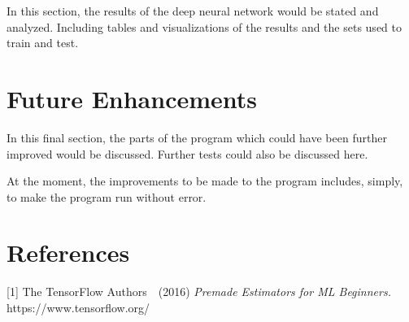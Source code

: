 \documentclass{article}
\begin{document}
In this section, the results of the deep neural network would
be stated and analyzed. Including tables and visualizations of
the results and the sets used to train and test.

\section{Future Enhancements}

In this final section, the parts of the program which could have
been further improved would be discussed. Further tests could also
be discussed here.

At the moment, the improvements to be made to the program includes,
simply, to make the program run without error.

\section*{References}

\small

[1] The TensorFlow Authors\ \ (2016) {\it Premade Estimators for ML
Beginners.} https://www.tensorflow.org/
\end{document}
